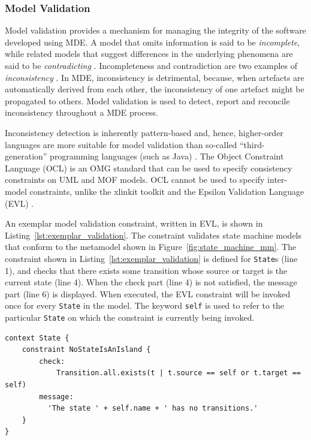 \subsubsection{Model Validation}
\label{subsubsec:model_validation}
Model validation provides a mechanism for managing the integrity of the software developed using MDE. A model that omits information is said to be \emph{incomplete}, while related models that suggest differences in the underlying phenomena are said to be \emph{contradicting} \cite{kolovos09thesis}. Incompleteness and contradiction are two examples of \emph{inconsistency} \cite{elaasar03consistency}. In MDE, inconsistency is detrimental, because, when artefacts are automatically derived from each other, the inconsistency of one artefact might be propagated to others. Model validation is used to detect, report and reconcile inconsistency throughout a MDE process.

Inconsistency detection is inherently pattern-based and, hence, higher-order languages are more suitable for model validation than so-called ``third-generation'' programming languages (such as Java) \cite{kolovos09thesis}. The Object Constraint Language (OCL) \cite{ocl2} is an OMG standard that can be used to specify consistency constraints on UML and MOF models. OCL cannot be used to specify inter-model constraints, unlike the xlinkit toolkit \cite{nentwich2003flexible} and the Epsilon Validation Language (EVL) \cite{kolovos08evl}.

An exemplar model validation constraint, written in EVL, is shown in Listing~\ref{lst:exemplar_validation}. The constraint validates state machine models that conform to the metamodel shown in Figure~\ref{fig:state_machine_mm}. The constraint shown in Listing~\ref{lst:exemplar_validation} is defined for \texttt{State}s (line 1), and checks that there exists some transition whose source or target is the current state (line 4). When the check part (line 4) is not satisfied, the message part (line 6) is displayed. When executed, the EVL constraint will be invoked once for every \texttt{State} in the model. The keyword \texttt{self} is used to refer to the particular \texttt{State} on which the constraint is currently being invoked.

\begin{lstlisting}[caption={[Model validation in EVL]Model validation in the Epsilon Validation Language}, label=lst:exemplar_validation, language=EVL]
context State {
	constraint NoStateIsAnIsland {
		check:
			Transition.all.exists(t | t.source == self or t.target == self)
		message:
		  'The state ' + self.name + ' has no transitions.'
	}
}
\end{lstlisting}

